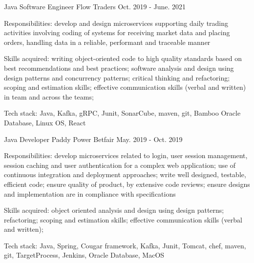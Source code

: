 \begin{cventries}
  \cventry
    {Java Software Engineer} %
    {Flow Traders} %
    {} %
    {Oct. 2019 - June. 2021} %
    {
      \begin{cvitems} %
        \item {Responsibilities: develop and design microservices supporting daily trading activities involving coding of systems for receiving market data and placing orders, handling data in a reliable, performant and traceable manner}
        \item {Skills acquired: writing object-oriented code to high quality standards based on best recommendations and best practices; software analysis and design using design patterns and concurrency patterns; critical thinking and refactoring; scoping and estimation skills; effective communication skills (verbal and written) in team and across the teams;}
        \item {Tech stack: Java, Kafka, gRPC, Junit, SonarCube, maven, git, Bamboo Oracle Database, Linux OS, React}
      \end{cvitems}
    }

  \cventry
    {Java Developer} %
    {Paddy Power Betfair} %
    {} %
    {May. 2019 - Oct. 2019} %
    {
      \begin{cvitems} %
        \item {Responsibilities: develop microservices related to login, user session management, session caching and user authentication for a complex web application; use of continuous integration and deployment approaches; write well designed, testable, efficient code; ensure quality of product, by extensive code reviews; ensure designs and implementation are in compliance with specifications}
        \item {Skills acquired: object oriented analysis and design using design patterns; refactoring; scoping and estimation skills; effective communication skills (verbal and written);}
        \item {Tech stack: Java, Spring, Cougar framework, Kafka, Junit, Tomcat, chef, maven, git, TargetProcess, Jenkins, Oracle Database, MacOS}
      \end{cvitems}
    }


\end{cventries}

